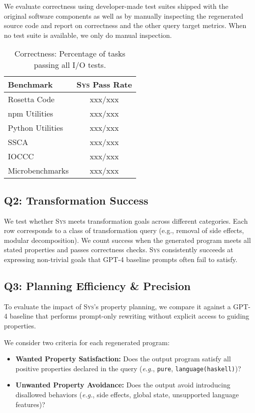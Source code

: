 \documentclass[sigplan]{acmart}
\def\eg{{\em e.g.}, }
\newcommand{\sys}{{\scshape Sys}\xspace}
\newcommand{\xxx}{\colorbox{red!30}{xxx}\xspace}
\begin{document}
We evaluate correctness using developer-made test suites 
shipped with the original software components as well as by manually inspecting
the regenerated source code and report on correctness and the other query target metrics.
When no test suite is available, we only do manual inspection.

\begin{table}[h]
  \centering
  \caption{Correctness: Percentage of tasks passing all I/O tests.}
  \begin{tabular}{lc}
    \toprule
    Benchmark & \sys Pass Rate \\ 
    \midrule
    Rosetta Code & \xxx/\xxx  \\
    npm Utilities & \xxx/\xxx \\
    Python Utilities & \xxx/\xxx \\
    SSCA & \xxx/\xxx  \\
    IOCCC & \xxx/\xxx  \\
    Microbenchmarks & \xxx/\xxx  \\
    \bottomrule
  \end{tabular}
\end{table}

\subsection{Q2: Transformation Success}

We test whether \sys meets transformation goals across different categories.
Each row corresponds to a class of transformation query (e.g., removal of side effects, modular decomposition).
We count success when the generated program meets all stated properties and passes correctness checks.
\sys consistently succeeds at expressing non-trivial goals that GPT-4 baseline prompts often fail to satisfy.

\subsection{Q3: Planning Efficiency \& Precision}

To evaluate the impact of \sys's property planning, we compare it against a GPT-4 baseline that performs prompt-only rewriting without explicit access to guiding properties.

We consider two criteria for each regenerated program:

\begin{itemize}
  \item \textbf{Wanted Property Satisfaction:} Does the output program satisfy all positive properties declared in the query (\eg \texttt{pure}, \texttt{language(haskell)})?
  \item \textbf{Unwanted Property Avoidance:} Does the output avoid introducing disallowed behaviors (\eg side effects, global state, unsupported language features)?
\end{itemize}
\end{document}
